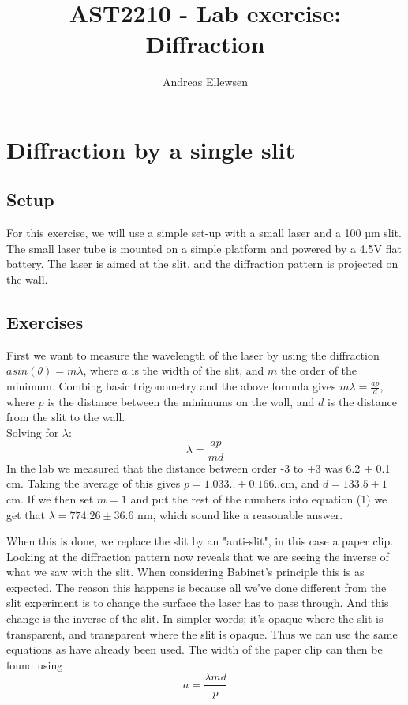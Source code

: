\documentclass[a4paper,12pt]{article}
\title{AST2210 - Lab exercise: Diffraction}
\author{Andreas Ellewsen}
\begin{document}
\maketitle

\section{Diffraction by a single slit}
\subsection{Setup}
For this exercise, we will use a simple set-up with a small laser and a 100 µm slit. The small laser tube is mounted  on a simple platform and powered by a 4.5V flat battery. The laser is aimed at the slit, and the diffraction pattern is projected on the wall.
\subsection{Exercises}
First we want to measure the wavelength of the laser by using the diffraction $asin(\theta) = m\lambda$, where $a$ is the width of the slit, and $m$ the order of the minimum. Combing basic trigonometry and the above formula gives $m\lambda = \frac{ap}{d}$, where $p$ is the distance between the minimums on the wall, and $d$ is the distance from the slit to the wall. \\
Solving for $\lambda$: 
\begin{equation}
\lambda = \frac{ap}{md}
\label{eq1}
\end{equation}
In the lab we measured that the distance between order -3 to +3 was 6.2 $\pm$ 0.1 cm. Taking the average of this gives $p = 1.033.. \pm 0.166..$cm, and $d = 133.5 \pm 1 $cm.
If we then set $m = 1$ and put the rest of the numbers into equation (1) we get that $\lambda = 774.26 \pm 36.6$ nm, which sound like a reasonable answer.

When this is done, we replace the slit by an "anti-slit", in this case a paper clip. Looking at the diffraction pattern now reveals that we are seeing the inverse of what we saw with the slit.
When considering Babinet's principle this is as expected. The reason this happens is because all we've done different from the slit experiment is to change the surface the laser has to pass through. And this change is the inverse of the slit. In simpler words; it's opaque where the slit is transparent, and transparent where the slit is opaque. Thus we can use the same equations as have already been used. The width of the paper clip can then be found using
\begin{equation}
a = \frac{\lambda md}{p}
\end{equation}
\end{document}
